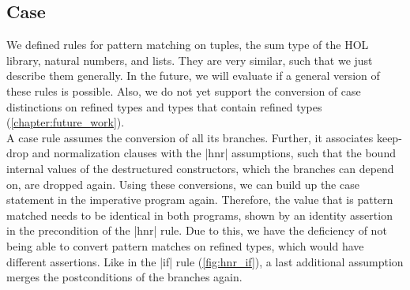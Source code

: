 \subsection{Case}

We defined rules for pattern matching on tuples, the sum type of the HOL library, natural numbers, and lists. They are very similar, such that we just describe them generally. In the future, we will evaluate if a general version of these rules is possible. Also, we do not yet support the conversion of case distinctions on refined types and types that contain refined types (\autoref{chapter:future_work}).\\
A case rule assumes the conversion of all its branches. Further, it associates keep-drop and normalization clauses with the |hnr| assumptions, such that the bound internal values of the destructured constructors, which the branches can depend on, are dropped again. Using these conversions, we can build up the case statement in the imperative program again. Therefore, the value that is pattern matched needs to be identical in both programs, shown by an identity assertion in the precondition of the |hnr| rule. Due to this, we have the deficiency of not being able to convert pattern matches on refined types, which would have different assertions.
Like in the |if| rule (\autoref{fig:hnr_if}), a last additional assumption merges the postconditions of the branches again.

